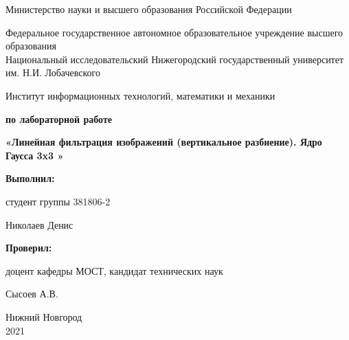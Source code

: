 \documentclass{report}
\begin{document}
\begin{titlepage}

\begin{center}
Министерство науки и высшего образования Российской Федерации
\end{center}

\begin{center}
Федеральное государственное автономное образовательное учреждение высшего образования \\
Национальный исследовательский Нижегородский государственный университет им. Н.И. Лобачевского
\end{center}

\begin{center}
Институт информационных технологий, математики и механики
\end{center}

\vspace{4em}

\begin{center}
\textbf{ по лабораторной работе} \\
\end{center}
\begin{center}
\textbf{\Large«Линейная фильтрация изображений (вертикальное разбиение). Ядро Гаусса 3x3 »} \\
\end{center}

\vspace{4em}

\newbox{\lbox}
\newlength{\maxl}
\setlength{\maxl}{\wd\lbox}
\hfill\parbox{7cm}{
\hspace*{5cm}\hspace*{-5cm}\textbf{Выполнил:} 

студент группы 381806-2 

Николаев Денис


\hspace*{5cm}\hspace*{-5cm}\textbf{Проверил:}

доцент кафедры МОСТ,  кандидат технических наук 

Сысоев А.В. 

}
\vspace{\fill}

\begin{center} Нижний Новгород \\ 2021 \end{center}

\end{titlepage}
\end{document}
